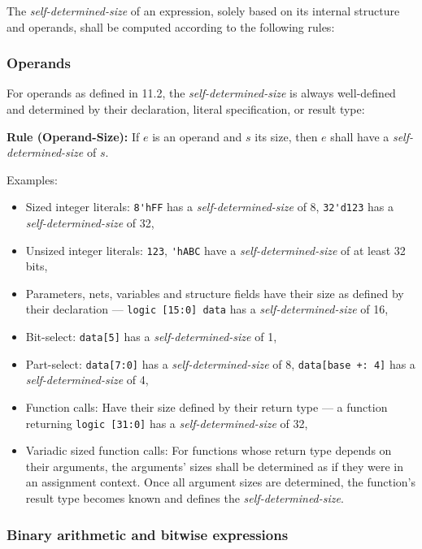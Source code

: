 \documentclass{article}
\newcommand{\sds}{\emph{self-determined-size}}
\newenvironment{typingrule}[1]%
{\par\noindent\textbf{Rule (#1):} }%
{\par}
\begin{document}
The \sds{} of an expression, solely based on its internal
structure and operands, shall be computed according to the following rules:

\subsubsection{Operands}%
\label{operands}

For operands as defined in 11.2, the \sds{} is always
well-defined and determined by their declaration, literal specification, or
result type:

\begin{typingrule}{Operand-Size}
  If $e$ is an operand and $s$ its size, then $e$ shall have a \sds{} of $s$.
\end{typingrule}

Examples:

\begin{itemize}
  \item Sized integer literals: \verb|8'hFF| has a \sds{} of 8,
    \verb|32'd123| has a \sds{} of 32,
  \item Unsized integer literals: \verb|123|, \verb|'hABC| have a
    \sds{} of at least 32 bits,
  \item Parameters, nets, variables and structure fields have their size as
    defined by their declaration --- \verb|logic [15:0] data| has a
    \sds{} of 16,
  \item Bit-select: \verb|data[5]| has a \sds{} of 1,
  \item Part-select: \verb|data[7:0]| has a \sds{} of 8,
    \verb|data[base +: 4]| has a \sds{} of 4,
  \item Function calls: Have their size defined by their return type --- a
    function returning \verb|logic [31:0]| has a
    \sds{} of 32,
  \item Variadic sized function calls: For functions whose return type depends
    on their arguments, the arguments' sizes shall be determined as if
    they were in an assignment context. Once all argument sizes are
    determined, the function's result type becomes known and defines the
    \sds{}.
\end{itemize}

\subsubsection{Binary arithmetic and bitwise expressions}%
\label{binary-arithmetic-and-bitwise-expressions}
\end{document}
